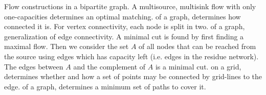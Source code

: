 \begin{algorithm}{Flow constructions}
 in a bipartite graph. A multisource, multisink flow
with only one-capacities determines an optimal matching.
 of a graph, determines how connected
it is. For vertex connectivity, each node is split in two.
 of a graph, generalization of edge connectivity. A
minimal cut is found by first finding a maximal flow. Then we consider the
set $A$ of all nodes that can be reached from the source using edges which
has capacity left (i.e. edges in the residue network). The edges between
$A$ and the complement of $A$ is a minimal cut.
 on a grid, determines whether and how a set of
points may be connected by grid-lines to the edge.
 of a graph, determines a minimum set of paths to
cover it.
\end{algorithm}
